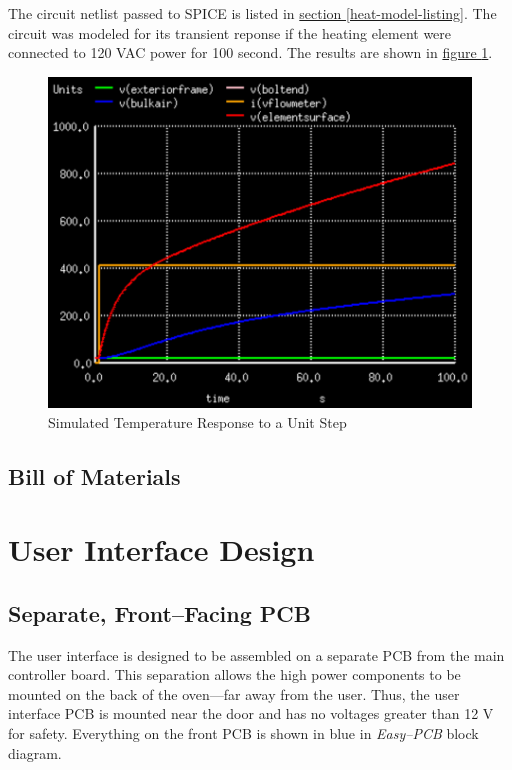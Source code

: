 \documentclass[10pt, twocolumn]{article}
\begin{document}
The circuit netlist passed to SPICE is listed in
\hyperref[heat-model-listing]{section \ref{heat-model-listing}}.
The circuit was modeled for its transient reponse if the heating element
were connected to 120 VAC power for 100 second.
The results are shown in
\hyperref[heat-model-results]{figure \ref{heat-model-results}}.

\begin{figure}
	\centering
	\includegraphics[width=1\columnwidth]{Figures/heat-model-results.pdf}
	\caption{Simulated Temperature Response to a Unit Step}
	\label{heat-model-results}
\end{figure}

\subsection{Bill of Materials}

\section{User Interface Design}

\subsection{Separate, Front--Facing PCB}

The user interface is designed to be assembled on a separate PCB
from the main controller board. This separation allows the high power
components to be mounted on the back of the oven---far away from the user.
Thus, the user interface PCB is mounted near the door and has no
voltages greater than 12 V for safety. Everything on the front PCB
is shown in blue in \emph{Easy--PCB} block diagram.
\end{document}
